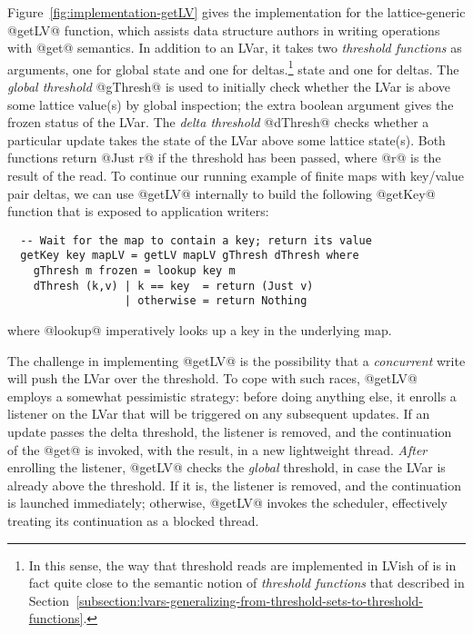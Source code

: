 Figure~\ref{fig:implementation-getLV} gives the implementation for the
lattice-generic @getLV@ function, which assists data structure authors
in writing operations with @get@ semantics.  In addition to an LVar,
it takes two \emph{threshold functions} as arguments, one for global
\ifdefined\DISSERTATION
state and one for deltas.\footnote{In this sense, the way that
  threshold reads are implemented in LVish of is in fact quite close
  to the semantic notion of \emph{threshold functions} that 
  described in
  Section~\ref{subsection:lvars-generalizing-from-threshold-sets-to-threshold-functions}.}
\fi
\ifdefined\JOURNAL
state and one for deltas.
\fi
The \emph{global threshold} @gThresh@ is used to initially check
whether the LVar is above some lattice value(s) by global inspection;
the extra boolean argument gives the frozen status of the LVar.  The
\emph{delta threshold} @dThresh@ checks whether a particular update
takes the state of the LVar above some lattice state(s).  Both
functions return @Just r@ if the threshold has been passed, where @r@
is the result of the read.  To continue our running example of finite
maps with key/value pair deltas, we can use @getLV@ internally to
build the following @getKey@ function that is exposed to application
writers:

\singlespacing
\begin{lstlisting}
  -- Wait for the map to contain a key; return its value
  getKey key mapLV = getLV mapLV gThresh dThresh where
    gThresh m frozen = lookup key m
    dThresh (k,v) | k == key  = return (Just v)
                  | otherwise = return Nothing 
\end{lstlisting}
\doublespacing

where @lookup@ imperatively looks up a key in the underlying map.

The challenge in implementing @getLV@ is the possibility that a
\emph{concurrent} write will push the LVar over the threshold.  To
cope with such races, @getLV@ employs a somewhat pessimistic strategy:
before doing anything else, it enrolls a listener on the LVar that
will be triggered on any subsequent updates.  If an update passes the
delta threshold, the listener is removed, and the continuation of the
@get@ is invoked, with the result, in a new lightweight thread.
\emph{After} enrolling the listener, @getLV@ checks the \emph{global}
threshold, in case the LVar is already above the threshold.  If it is,
the listener is removed, and the continuation is launched immediately;
otherwise, @getLV@ invokes the scheduler, effectively treating its
continuation as a blocked thread.

